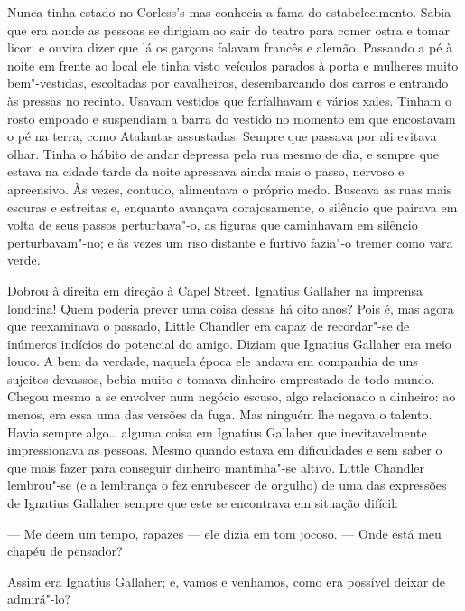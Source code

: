 Nunca tinha estado no Corless’s mas conhecia a fama do estabelecimento.  Sabia
que era aonde as pessoas se dirigiam ao sair do teatro para comer ostra e tomar
licor; e ouvira dizer que lá os garçons falavam francês e alemão.  Passando a
pé à noite em frente ao local ele tinha visto veículos parados à porta e
mulheres muito bem"-vestidas, escoltadas por cavalheiros, desembarcando dos
carros e entrando às pressas no recinto.  Usavam vestidos que farfalhavam e
vários xales.  Tinham o rosto empoado e suspendiam a barra do vestido no
momento em que encostavam o pé na terra, como Atalantas assustadas.  Sempre que
passava por ali evitava olhar.  Tinha o hábito de andar depressa pela rua mesmo
de dia, e sempre que estava na cidade tarde da noite apressava ainda mais o
passo, nervoso e apreensivo.  Às vezes, contudo, alimentava o próprio medo.
Buscava as ruas mais escuras e estreitas e, enquanto avançava corajosamente, o
silêncio que pairava em volta de seus passos perturbava"-o, as figuras que
caminhavam em silêncio perturbavam"-no; e às vezes um riso distante e furtivo
fazia"-o tremer como vara verde.

Dobrou à direita em direção à Capel Street.  Ignatius Gallaher na imprensa
londrina!  Quem poderia prever uma coisa dessas há oito anos?  Pois é, mas
agora que reexaminava o passado, Little Chandler era capaz de recordar"-se de
inúmeros indícios do potencial do amigo.  Diziam que Ignatius Gallaher era meio
louco.  A bem da verdade, naquela época ele andava em companhia de uns sujeitos
devassos, bebia muito e tomava dinheiro emprestado de todo mundo.  Chegou mesmo
a se envolver num negócio escuso, algo relacionado a dinheiro: ao menos, era
essa uma das versões da fuga.  Mas ninguém lhe negava o talento.  Havia sempre
algo\ldots{} alguma coisa em Ignatius Gallaher que inevitavelmente
impressionava as pessoas.  Mesmo quando estava em dificuldades e sem saber o
que mais fazer para conseguir dinheiro mantinha"-se altivo.  Little Chandler
lembrou"-se (e a lembrança o fez enrubescer de orgulho) de uma das expressões de
Ignatius Gallaher sempre que este se encontrava em situação difícil:

--- Me deem um tempo, rapazes --- ele dizia em tom jocoso.  --- Onde está meu
chapéu de pensador?

Assim era Ignatius Gallaher; e, vamos e venhamos, como era possível deixar de
admirá"-lo?

